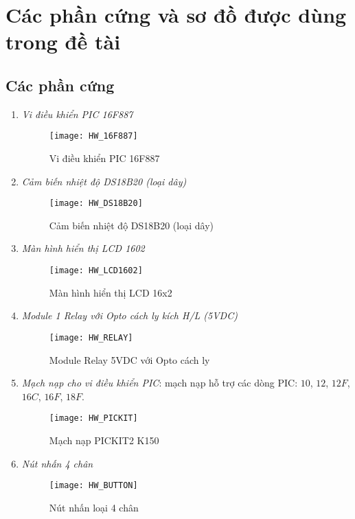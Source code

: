 \chapter{Các phần cứng và sơ đồ được dùng trong đề tài} \label{phancung-sodo}
\section*{Các phần cứng} \label{phuluc-phancung}
\begin{enumerate}
\item \textit{Vi điều khiển PIC 16F887}
\begin{figure}[h]
\begin{center}
\texttt{[image: HW\_16F887]}
\end{center}
\caption{Vi điều khiển PIC 16F887}
\end{figure}

\item \textit{Cảm biến nhiệt độ DS18B20 (loại dây)}
\begin{figure}[h]
\begin{center}
\texttt{[image: HW\_DS18B20]} 
\end{center}
\caption{Cảm biến nhiệt độ DS18B20 (loại dây)} \label{DS18B200}
\end{figure}

\item \textit{Màn hình hiển thị LCD 1602}
\begin{figure}[h]
\begin{center}
\texttt{[image: HW\_LCD1602]}
\end{center}
\caption{Màn hình hiển thị LCD 16x2} \label{LCD1602}
\end{figure}

\item \textit{Module 1 Relay với Opto cách ly kích H/L (5VDC)}
\begin{figure}[h]
\begin{center}
\texttt{[image: HW\_RELAY]}
\end{center}
\caption{Module Relay 5VDC với Opto cách ly}\label{RELAY}
\end{figure}

\item \textit{Mạch nạp cho vi điều khiển PIC}: mạch nạp hỗ trợ các dòng PIC: $10$, $12$, $12F$, $16C$, $16F$, $18F$.
\begin{figure}[h]
\begin{center}
\texttt{[image: HW\_PICKIT]}
\end{center}
\caption{Mạch nạp PICKIT2 K150} 
\end{figure}
\newpage
\item \textit{Nút nhấn 4 chân}
\begin{figure}[h]
\begin{center}
\texttt{[image: HW\_BUTTON]}
\end{center}
\caption{Nút nhấn loại 4 chân}
\end{figure}


\end{enumerate}
